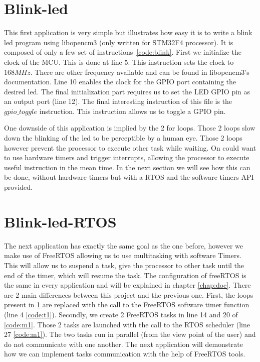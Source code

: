 \documentclass[12pt,a4paper]{report}
\begin{document}
\section{Blink-led}
\label{sec:bl}
This first application is very simple but illustrates how easy it is to write a blink led program using libopencm3 (only written for STM32F4 processor). It is composed of only a few set of instructions~\ref{code:blink}. First we initialize the clock of the MCU. This is done at line 5. This instruction sets the clock to $168MHz$. There are other frequency available and can be found in libopencm3's documentation. Line 10 enables the clock for the GPIO port containing the desired led. The final initialization part requires us to set the LED GPIO pin as an output port (line 12).\newline
The final interesting instruction of this file is the $gpio\_toggle$ instruction. This instruction allows us to toggle a GPIO pin. 

One downside of this application is implied by the 2 for loops. Those 2 loops slow down the blinking of the led to be perceptible by a human eye. Those 2 loops however prevent the processor to execute other task while waiting. On could want to use hardware timers and trigger interrupts, allowing the processor to execute useful instruction in the mean time. In the next section we will see how this can be done, without hardware timers but with a RTOS and the software timers API provided.
\section{Blink-led-RTOS}
\label{sec:blr}
The next application has exactly the same goal as the one before, however we make use of FreeRTOS allowing us to use multitasking with software Timers. This will allow us to suspend a task, give the processor to other task until the end of the timer, which will resume the task. The configuration of freeRTOS is the same in every application and will be explained in chapter \ref{chap:doc}. There are 2 main differences between this project and the previous one. First, the loops present in \ref{sec:bl} are replaced with the call to the FreeRTOS software timer function (line 4 \ref{code:t1}). Secondly, we create 2 FreeRTOS tasks in line 14 and 20 of \ref{code:m1}. Those 2 tasks are launched with the call to the RTOS scheduler (line 27 \ref{code:m1}). The two tasks run in parallel (from the view point of the user) and do not communicate with one another. The next application will demonstrate how we can implement tasks communication with the help of FreeRTOS tools. 


\end{document}
